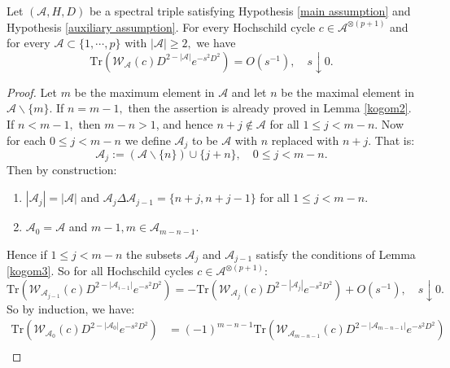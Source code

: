     \begin{lem}\label{kogom4} 
        Let $(\mathcal{A},H,D)$ be a spectral triple satisfying Hypothesis \ref{main assumption} and Hypothesis \ref{auxiliary assumption}. 
        For every Hochschild cycle $c\in\mathcal{A}^{\otimes (p+1)}$ and for every $\mathscr{A}\subset\{1,\cdots,p\}$ with $|\mathscr{A}|\geq 2,$ we have
        \begin{equation*}
            \mathrm{Tr}(\mathcal{W}_{\mathscr{A}}(c)D^{2-|\mathscr{A}|}e^{-s^2D^2}) = O(s^{-1}),\quad s\downarrow0.
        \end{equation*}
    \end{lem}
    \begin{proof} 
        Let $m$ be the maximum element in $\mathscr{A}$ and let $n$ be the maximal element in $\mathscr{A}\backslash\{m\}.$ 
        If $n=m-1,$ then the assertion is already proved in Lemma \ref{kogom2}. If $n < m-1,$ then $m-n > 1$, and hence $n+j \notin \mathscr{A}$
        for all $1 \leq j < m-n$. Now for each $0 \leq j < m-n$ we define $\mathscr{A}_j$ to be $\mathscr{A}$ with $n$ replaced with $n+j$. That is:
        \begin{equation*}
            \mathscr{A}_j := (\mathscr{A}\backslash\{n\})\cup\{j+n\},\quad 0 \leq j < m-n.
        \end{equation*}
        Then by construction:
        \begin{enumerate}
            \item $|\mathscr{A}_j|=|\mathscr{A}|$ and $\mathscr{A}_j\Delta\mathscr{A}_{j-1} = \{n+j,n+j-1\}$ for all $1 \leq j < m-n.$
            \item $\mathscr{A}_0=\mathscr{A}$ and $m-1,m\in\mathscr{A}_{m-n-1}.$
        \end{enumerate}
        Hence if $1 \leq j < m-n$ the subsets $\mathscr{A}_j$ and $\mathscr{A}_{j-1}$ satisfy the conditions of Lemma \ref{kogom3}. So for all Hochschild cycles $c \in \mathcal{A}^{\otimes (p+1)}$:
        \begin{equation*}
            \mathrm{Tr}(\mathcal{W}_{\mathscr{A}_{j-1}}(c)D^{2-|\mathscr{A}_{i-1}|}e^{-s^2D^2})=-\mathrm{Tr}(\mathcal{W}_{\mathscr{A}_j}(c)D^{2-|\mathscr{A}_{j}|}e^{-s^2D^2}) + O(s^{-1}),\quad s \downarrow 0.
        \end{equation*}
        So by induction, we have:
        \begin{align}\label{beginning and end}
            \mathrm{Tr}(\mathcal{W}_{\mathscr{A}_0}(c)D^{2-|\mathscr{A}_0|}e^{-s^2D^2}) &= (-1)^{m-n-1}\mathrm{Tr}(\mathcal{W}_{\mathscr{A}_{m-n-1}}(c)D^{2-|\mathscr{A}_{m-n-1}|}e^{-s^2D^2})\nonumber\\

\end{align}
\end{proof}
